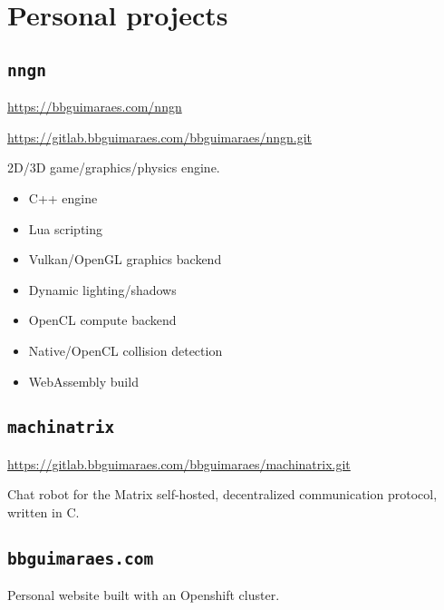\section*{Personal projects}
\subsection*{\texttt{nngn}}

\url{https://bbguimaraes.com/nngn}

\url{https://gitlab.bbguimaraes.com/bbguimaraes/nngn.git}

2D/3D game/graphics/physics engine.

\begin{itemize}
    \item C++ engine
    \item Lua scripting
    \item Vulkan/OpenGL graphics backend
    \item Dynamic lighting/shadows
    \item OpenCL compute backend
    \item Native/OpenCL collision detection
    \item WebAssembly build
\end{itemize}

\subsection*{\texttt{machinatrix}}

\url{https://gitlab.bbguimaraes.com/bbguimaraes/machinatrix.git}

Chat robot for the Matrix self-hosted, decentralized communication protocol,
written in C.

\subsection*{\texttt{bbguimaraes.com}}

Personal website built with an Openshift cluster.

